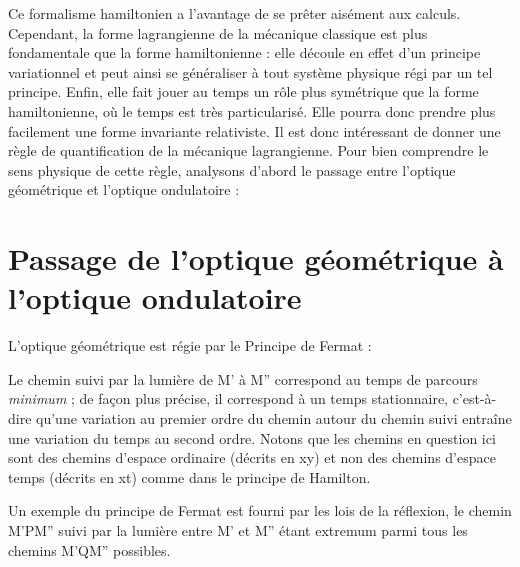Ce formalisme hamiltonien a l'avantage de se prêter aisément
aux calculs. Cependant, la forme lagrangienne de la mécanique classique
est plus fondamentale que la forme hamiltonienne : elle découle en effet
d'un principe variationnel et peut ainsi se généraliser à tout système
physique régi par un tel principe. Enfin, elle fait jouer au temps un
rôle plus symétrique que la forme hamiltonienne, où le temps est très
particularisé. Elle pourra donc prendre plus facilement une forme invariante relativiste.
Il est donc intéressant de donner une règle de quantification de la mécanique lagrangienne.
Pour bien comprendre le sens
physique de cette règle, analysons d'abord le passage entre l'optique
géométrique et l'optique ondulatoire :
\section{Passage de l'optique géométrique à l'optique ondulatoire}
L'optique géométrique est régie par le Principe de Fermat :

\begin{center}  \end{center}
 
Le chemin suivi par la lumière de M' à M'' correspond au
temps de parcours {\it minimum} ; de façon plus précise, il correspond à un
temps stationnaire, c'est-à-dire qu'une variation au premier ordre du
chemin autour du chemin suivi entraîne une variation du temps au second
ordre. Notons que les chemins en question ici sont des chemins d'espace
ordinaire (décrits en xy) et non des chemins d'espace temps (décrits en
xt) comme dans le principe de Hamilton.

Un exemple du principe de Fermat est fourni par les lois de
la réflexion, le chemin M'PM'' suivi par la lumière entre M' et M'' étant
extremum parmi tous les chemins M'QM'' possibles.

\begin{center}  \end{center}


